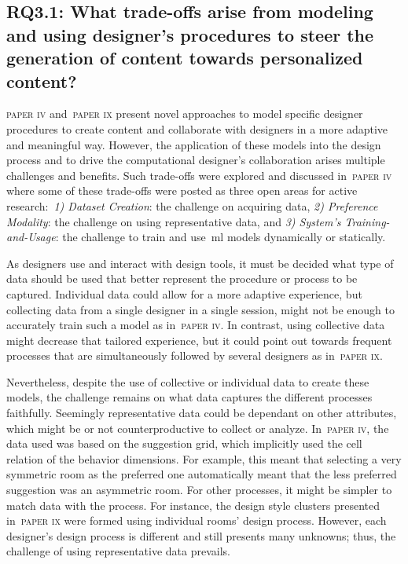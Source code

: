 \subsection[Research Question 3.1]{RQ3.1: What trade-offs arise from modeling and using designer's procedures to steer the generation of content towards personalized content?}

\textsc{paper iv} and~\textsc{paper ix} present novel approaches to model specific designer procedures to create content and collaborate with designers in a more adaptive and meaningful way. However, the application of these models into the design process and to drive the computational designer's collaboration arises multiple challenges and benefits. Such trade-offs were explored and discussed in~\textsc{paper iv} where some of these trade-offs were posted as three open areas for active research:~\textit{1) Dataset Creation}: the challenge on acquiring data, \textit{2) Preference Modality}: the challenge on using representative data, and \textit{3) System's Training-and-Usage}: the challenge to train and use~\acrshort{ml} models dynamically or statically.  

As designers use and interact with design tools, it must be decided what type of data should be used that better represent the procedure or process to be captured. Individual data could allow for a more adaptive experience, but collecting data from a single designer in a single session, might not be enough to accurately train such a model as in~\textsc{paper iv}. In contrast, using collective data might decrease that tailored experience, but it could point out towards frequent processes that are simultaneously followed by several designers as in~\textsc{paper ix}.

Nevertheless, despite the use of collective or individual data to create these models, the challenge remains on what data captures the different processes faithfully. Seemingly representative data could be dependant on other attributes, which might be or not counterproductive to collect or analyze. In~\textsc{paper iv}, the data used was based on the suggestion grid, which implicitly used the cell relation of the behavior dimensions. For example, this meant that selecting a very symmetric room as the preferred one automatically meant that the less preferred suggestion was an asymmetric room. For other processes, it might be simpler to match data with the process. For instance, the design style clusters presented in~\textsc{paper ix} were formed using individual rooms' design process. However, each designer's design process is different and still presents many unknowns; thus, the challenge of using representative data prevails.

